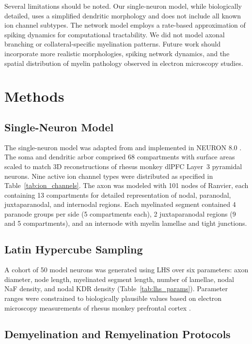 \documentclass[11pt]{article}
\begin{document}
Several limitations should be noted. Our single-neuron model, while biologically detailed, uses a simplified dendritic morphology and does not include all known ion channel subtypes. The network model employs a rate-based approximation of spiking dynamics for computational tractability. We did not model axonal branching or collateral-specific myelination patterns. Future work should incorporate more realistic morphologies, spiking network dynamics, and the spatial distribution of myelin pathology observed in electron microscopy studies.

\section{Methods}

\subsection{Single-Neuron Model}

The single-neuron model was adapted from \citet{rumbell2016} and implemented in NEURON 8.0 \citep{hines1997}. The soma and dendritic arbor comprised 68 compartments with surface areas scaled to match 3D reconstructions of rhesus monkey dlPFC Layer~3 pyramidal neurons. Nine active ion channel types were distributed as specified in Table~\ref{tab:ion_channels}. The axon was modeled with 101 nodes of Ranvier, each containing 13 compartments for detailed representation of nodal, paranodal, juxtaparanodal, and internodal regions. Each myelinated segment contained 4 paranode groups per side (5 compartments each), 2 juxtaparanodal regions (9 and 5 compartments), and an internode with myelin lamellae and tight junctions.

\subsection{Latin Hypercube Sampling}

A cohort of 50 model neurons was generated using LHS \citep{mckay1979} over six parameters: axon diameter, node length, myelinated segment length, number of lamellae, nodal NaF density, and nodal KDR density (Table~\ref{tab:lhs_params}). Parameter ranges were constrained to biologically plausible values based on electron microscopy measurements of rhesus monkey prefrontal cortex \citep{peters2009, bowley2010}.

\subsection{Demyelination and Remyelination Protocols}
\end{document}
